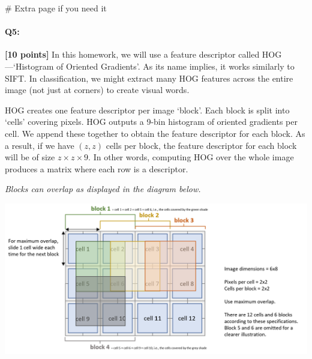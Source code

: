 \pagebreak

\begin{tcolorbox}[colback=white!5!white,colframe=green!75!black]
    \begin{python}
        # Extra page if you need it
            
        \end{python}
\end{tcolorbox}



\pagebreak
\paragraph{Q5:} \textbf{[10 points]} 
In this homework, we will use a feature descriptor called HOG---`Histogram of Oriented Gradients'. As its name implies, it works similarly to SIFT. In classification, we might extract many HOG features across the entire image (not just at corners) to create visual words.

HOG creates one feature descriptor per image `block'. Each block is split into `cells' covering pixels. HOG outputs a 9-bin histogram of oriented gradients per cell. We append these together to obtain the feature descriptor for each block. As a result, if we have $(z,z)$ cells per block, the feature descriptor for each block will be of size $z \times z \times 9$. In other words, computing HOG over the whole image produces a matrix where each row is a descriptor. 

\emph{Blocks can overlap as displayed in the diagram below.}

\begin{center}
    \includegraphics[width=\linewidth]{images/hog-diagram.png}
\end{center}

